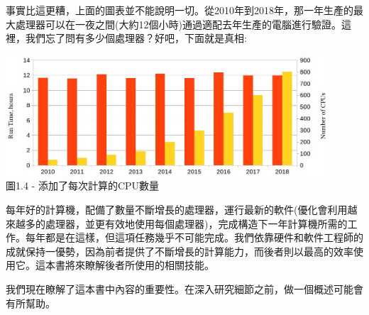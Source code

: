 事實比這更糟，上面的圖表並不能說明一切。從2010年到2018年，那一年生產的最大處理器可以在一夜之間(大約12個小時)通過適配去年生產的電腦進行驗證。這裡，我們忘了問有多少個處理器？好吧，下面就是真相:

\begin{center}
\includegraphics[width=0.9\textwidth]{content/1/chapter1/images/4.jpg}\\
圖1.4 - 添加了每次計算的CPU數量
\end{center}

每年好的計算機，配備了數量不斷增長的處理器，運行最新的軟件(優化會利用越來越多的處理器，並更有效地使用每個處理器)，完成構造下一年計算機所需的工作。每年都是在這樣，但這項任務幾乎不可能完成。我們依靠硬件和軟件工程師的成就保持一優勢，因為前者提供了不斷增長的計算能力，而後者則以最高的效率使用它。這本書將來瞭解後者所使用的相關技能。

我們現在瞭解了這本書中內容的重要性。在深入研究細節之前，做一個概述可能會有所幫助。


















